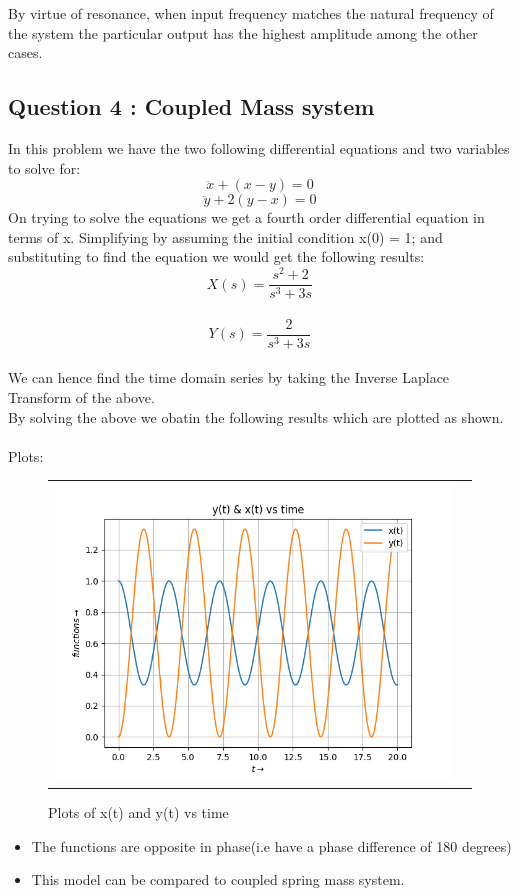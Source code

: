 \documentclass[11pt, a4paper]{article}
\begin{document}
	    By virtue of resonance, when input frequency matches the natural frequency of the system the particular output has the highest amplitude among the other cases.
	  
	\subsection{Question 4 : Coupled Mass system}
 	
    	In this problem we have the two following differential equations and two variables to solve for:\\
    	\[\ddot{x} + (x-y) = 0 \]
	\[\ddot{y} + 2(y-x) = 0 \]
	On trying to solve the equations we get a fourth order differential equation in terms of x. Simplifying by assuming the initial condition x(0) = 1; and substituting to find the equation we would get the following results:\\
	\[X(s) = \frac{s^2+2}{s^3+3s} \]\\
	\[Y(s) =  \frac{2}{s^3+3s} \]\\
        
        We can hence find the time domain series by taking the Inverse Laplace Transform of the above.
        \\By solving the above we obatin the following results which are plotted as shown.\\
        \\Plots:
	       \begin{figure}[H]
                    \centering
                    \setlength\tabcolsep{2pt}
                    \begin{tabular}{cc}
                       \includegraphics[scale=0.9]{Figure 4.png}
                    \end{tabular}
                    \caption{Plots of x(t) and y(t) vs time} 
                \end{figure}
         \begin{itemize}
         \item
         The functions are opposite in phase(i.e have a phase difference of 180 degrees)
         \item
         This model can be compared to coupled spring mass system.
         
         \end{itemize}
\end{document}
